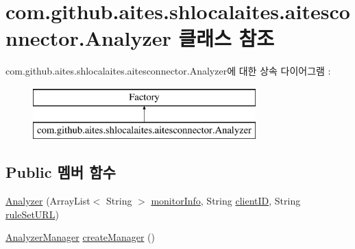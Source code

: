 \hypertarget{classcom_1_1github_1_1aites_1_1shlocalaites_1_1aitesconnector_1_1_analyzer}{}\section{com.\+github.\+aites.\+shlocalaites.\+aitesconnector.\+Analyzer 클래스 참조}
\label{classcom_1_1github_1_1aites_1_1shlocalaites_1_1aitesconnector_1_1_analyzer}
com.\+github.\+aites.\+shlocalaites.\+aitesconnector.\+Analyzer에 대한 상속 다이어그램 \+: \begin{figure}[H]
\begin{center}
\leavevmode
\includegraphics[height=2.000000cm]{classcom_1_1github_1_1aites_1_1shlocalaites_1_1aitesconnector_1_1_analyzer}
\end{center}
\end{figure}
\subsection*{Public 멤버 함수}
\begin{DoxyCompactItemize}
\item 
\mbox{\hyperlink{classcom_1_1github_1_1aites_1_1shlocalaites_1_1aitesconnector_1_1_analyzer_af638d89844738a18372c30f040cdb65e}{Analyzer}} (Array\+List$<$ String $>$ \mbox{\hyperlink{classcom_1_1github_1_1aites_1_1shlocalaites_1_1aitesconnector_1_1_analyzer_a33660c986fcdd452f0d02ddaf34649b5}{monitor\+Info}}, String \mbox{\hyperlink{classcom_1_1github_1_1aites_1_1shlocalaites_1_1aitesconnector_1_1_analyzer_a22ef8f04e7f85cdb211af143b32d966a}{client\+ID}}, String \mbox{\hyperlink{classcom_1_1github_1_1aites_1_1shlocalaites_1_1aitesconnector_1_1_analyzer_a4d70ca14c3921f457dbd46c8d1818f36}{rule\+Set\+U\+RL}})
\item 
\mbox{\hyperlink{classcom_1_1github_1_1aites_1_1shlocalaites_1_1aitesmanager_1_1_analyzer_manager}{Analyzer\+Manager}} \mbox{\hyperlink{classcom_1_1github_1_1aites_1_1shlocalaites_1_1aitesconnector_1_1_analyzer_ac4dda75b57fca5f9e506082de4a16ad8}{create\+Manager}} ()
\end{DoxyCompactItemize}

